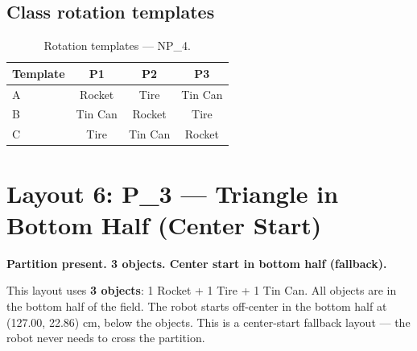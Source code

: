\documentclass[a4]{article}
\begin{document}
\subsection*{Class rotation templates}

\begin{table}[H]
\centering
\begin{tabular}{lccc}
\toprule
\textbf{Template} & \textbf{P1} & \textbf{P2} & \textbf{P3} \\
\midrule
A & Rocket & Tire & Tin Can \\
B & Tin Can & Rocket & Tire \\
C & Tire & Tin Can & Rocket \\
\bottomrule
\end{tabular}
\caption{Rotation templates --- NP\_4.}
\end{table}

\pagebreak
\section*{Layout 6: P\_3 --- Triangle in Bottom Half (Center Start)}

\textbf{Partition present. 3 objects. Center start in bottom half (fallback).}

This layout uses \textbf{3 objects}: 1 Rocket + 1 Tire + 1 Tin Can. All objects are in the bottom half of the field. The robot starts off-center in the bottom half at (127.00, 22.86) cm, below the objects. This is a center-start fallback layout --- the robot never needs to cross the partition.
\end{document}
